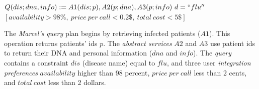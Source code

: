 \begin{center}
\small
$Q(dis; dna, info) := A1(dis; p), A2(p; dna), A3(p; info) \ d = ``flu'' $
\\
$[availability > 98\%, \ price \ per \ call < 0.2\$, \ total \ cost < 5\$]$
\end{center}

The \textit{Marcel's }\textit{query} plan begins by retrieving infected patients ($A1$). This operation returns patients' ids $p$. The \textit{abstract services} $A2$ and $A3$ use patient ids to return their DNA and personal information ($dna$ and $info$).
The \textit{query} contains a constraint $dis$ (disease name) equal to $flu$, and three user \textit{integration preferences} $availability$ higher than 98 percent, $price \ per \ call$ less than 2 cents, and $total \ cost$ less than 2 dollars.
%
%


